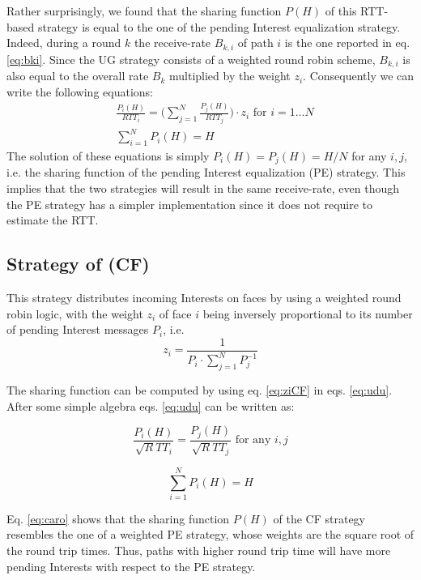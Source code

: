 \documentclass{sig-alternate-10pt}
\begin{document}
Rather surprisingly, we found that the sharing function $P(H)$ of this RTT-based strategy is equal to the one of the pending Interest equalization strategy. Indeed, during a round $k$ the receive-rate $B_{k,i}$ of path $i$ is the one reported in eq. \ref{eq:bki}. Since the UG strategy consists of a weighted round robin scheme, $B_{k,i}$ is also equal to the overall rate $B_k$ multiplied by the weight $z_i$. Consequently we can write the following equations:
\begin{equation}
\begin{aligned}
&\frac{P_i(H)}{RTT_i} = \bigg( \sum_{j=1}^{N} \frac{P_j(H)}{RTT_j} \bigg) \cdot z_i \mbox{    for   } i=1 \dots N \\
& \sum_{i=1}^{N} P_i(H) = H
\label{eq:udu}
\end{aligned}
\end{equation}
The solution of these equations is simply $P_i(H)=P_j(H)=H/N$ for any $i,j$, i.e. the sharing function of the pending Interest equalization (PE) strategy. This implies that the two strategies will result in the same receive-rate, even though the PE strategy has a simpler implementation since it does not require to estimate the RTT.

\subsection{Strategy of \cite{carofigliooptimal} (CF)}
\label{s:caro}
This strategy distributes incoming Interests on faces by using a weighted round robin logic, with the weight $z_i$ of face $i$ being inversely proportional to its number of pending Interest messages $P_i$, i.e.
\begin{equation}
z_i = \frac{1}{P_i \cdot \sum_{j=1}^{N} P_j^{-1}}
\label{eq:ziCF}
\end{equation}



The sharing function can be computed by using eq. \ref{eq:ziCF} in eqs. \ref{eq:udu}. After some simple algebra eqs. \ref{eq:udu} can be written as:

\begin{equation}
\frac{P_i(H)}{\sqrt RTT_i} = \frac{P_j(H)}{\sqrt RTT_j} \mbox{    for any   } i,j
\label{eq:caro}
\end{equation}

\begin{equation}
\sum_{i=1}^{N} P_i(H) = H
\end{equation}

Eq. \ref{eq:caro} shows that the sharing function $P(H)$ of the CF strategy resembles the one of a weighted PE strategy, whose weights are the square root of the round trip times. Thus, paths with higher round trip time will have more pending Interests with respect to the PE strategy.
\end{document}
